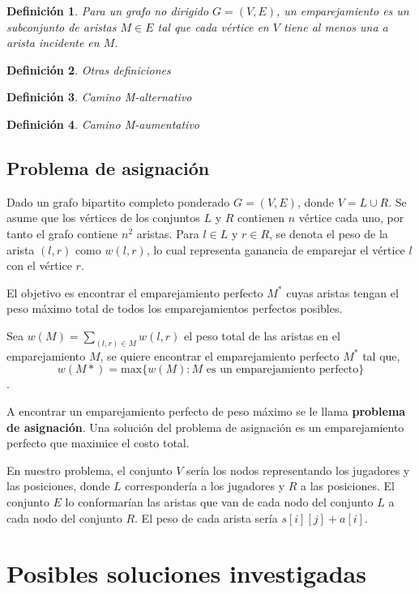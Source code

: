 \documentclass[10pt]{article} %
\newtheorem{mydef}{Definici\'on}%
\begin{document}
	\begin{mydef}
		Para un grafo no dirigido $G = (V,E)$, un emparejamiento es un subconjunto de aristas $M \in E$ tal que cada v\'ertice en $V$ tiene al menos una a arista incidente en $M$.
	\end{mydef}

	\begin{mydef}
		Otras definiciones
	\end{mydef}

	\begin{mydef}
		Camino M-alternativo
	\end{mydef}
	
	\begin{mydef}
		Camino M-aumentativo
	\end{mydef}
	
	\subsection{Problema de asignaci\'on}
	
	Dado un grafo bipartito completo ponderado $G = (V,E)$, donde $V = L \cup R$. Se asume que los v\'ertices de los conjuntos $L$ y $R$ contienen $n$ v\'ertice cada uno, por tanto el grafo contiene $n^2$ aristas. Para $l \in L$ y $r \in R$, se denota el peso de la arista $(l,r)$ como $w(l,r)$, lo cual representa ganancia de emparejar el v\'ertice $l$ con el v\'ertice $r$.
	
	El objetivo es encontrar el emparejamiento perfecto $M^*$ cuyas aristas tengan el peso m\'aximo total de todos los emparejamientos perfectos posibles. 
	
	Sea $w(M) = \sum_{(l,r) \in M} w(l,r)$ el peso total de las aristas en el emparejamiento $M$, se quiere encontrar el emparejamiento perfecto $M^*$ tal que,
	\[w(M*)=\text{max}\{w(M):M \text{ es un emparejamiento perfecto}\}\].
	
	A encontrar un emparejamiento perfecto de peso m\'aximo se le llama \textbf{problema de asignaci\'on}. Una soluci\'on del problema de asignaci\'on es un emparejamiento perfecto que maximice el costo total.
	
	En nuestro problema, el conjunto $V$ ser\'ia los nodos representando los jugadores y las posiciones, donde $L$ corresponder\'ia a los jugadores y $R$ a las posiciones. El conjunto $E$ lo conformar\'ian las aristas que van de cada nodo del conjunto $L$ a cada nodo del conjunto $R$. El peso de cada arista ser\'ia $s[i][j] + a[i]$.
	
	\section{Posibles soluciones investigadas}
	
\end{document}
